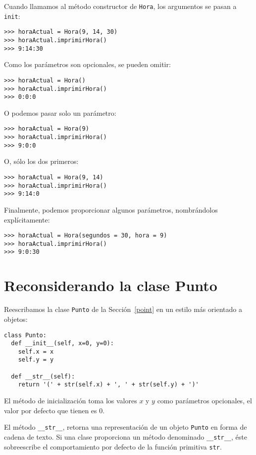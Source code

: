 
Cuando llamamos al método constructor de \texttt{Hora}, los argumentos se 
pasan a  \texttt{init}:

\beforeverb
\begin{verbatim}
>>> horaActual = Hora(9, 14, 30)
>>> horaActual.imprimirHora()
>>> 9:14:30
\end{verbatim}
\afterverb
%
Como los parámetros son opcionales, se pueden omitir:

\beforeverb
\begin{verbatim}
>>> horaActual = Hora()
>>> horaActual.imprimirHora()
>>> 0:0:0
\end{verbatim}
\afterverb
%
O podemos pasar solo un parámetro:

\beforeverb
\begin{verbatim}
>>> horaActual = Hora(9)
>>> horaActual.imprimirHora()
>>> 9:0:0
\end{verbatim}
\afterverb
%
O, sólo los dos primeros:

\beforeverb
\begin{verbatim}
>>> horaActual = Hora(9, 14)
>>> horaActual.imprimirHora()
>>> 9:14:0
\end{verbatim}
\afterverb
%
Finalmente, podemos proporcionar algunos
parámetros, nombrándolos explícitamente:

\beforeverb
\begin{verbatim}
>>> horaActual = Hora(segundos = 30, hora = 9)
>>> horaActual.imprimirHora()
>>> 9:0:30
\end{verbatim}
\afterverb
%

\section{Reconsiderando la clase Punto}

Reescribamos la clase \texttt{Punto} de la Sección~\ref{point} 
en un estilo más orientado a objetos:

\beforeverb
\begin{verbatim}
class Punto:
  def __init__(self, x=0, y=0):
    self.x = x
    self.y = y

  def __str__(self):
    return '(' + str(self.x) + ', ' + str(self.y) + ')'
\end{verbatim}
\afterverb
%
El método de inicialización toma los valores  $x$ y $y$ como
parámetros opcionales, el valor por defecto que tienen es 0.

El método \texttt{\_\_str\_\_}, retorna una representación
de un objeto  \texttt{Punto} en forma de cadena de texto. Si
una clase proporciona un método denominado \texttt{\_\_str\_\_}, 
éste sobreescribe el comportamiento por defecto de la 
función primitiva  \texttt{str}.

